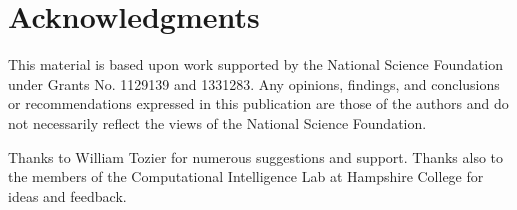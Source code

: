 \documentclass{sig-alternate}
\begin{document}
\section{Acknowledgments}

This material is based upon work supported by the National Science Foundation under 
Grants No. 1129139 and 1331283. Any opinions, findings, and conclusions or recommendations 
expressed in this publication are those of the authors and do not necessarily reflect the views of the 
National Science Foundation.

Thanks to William Tozier for numerous suggestions and support. Thanks also to the 
members of the Computational Intelligence Lab at Hampshire College for ideas and feedback.



\end{document}
